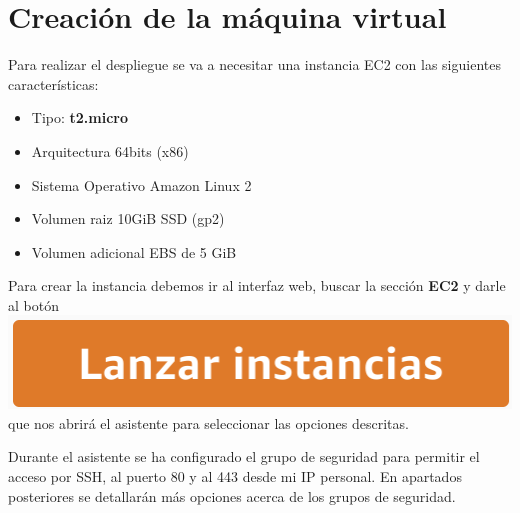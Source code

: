 \documentclass{\ClassPath/viu-tfm-template}
\begin{document}
\section{Creación de la máquina virtual}
Para realizar el despliegue se va a necesitar una instancia EC2 con las siguientes características:
\begin{itemize}
    \item Tipo: \textbf{t2.micro}
    \item Arquitectura 64bits (x86)
    \item Sistema Operativo Amazon Linux 2
    \item Volumen raiz 10GiB SSD (gp2)
    \item Volumen adicional EBS de 5 GiB
\end{itemize}

Para crear la instancia debemos ir al interfaz web, buscar la sección \textbf{EC2} y darle al botón \includegraphics[width=0.2\linewidth]{img/boton.png} que nos abrirá el asistente para seleccionar las opciones descritas.

Durante el asistente se ha configurado el grupo de seguridad para permitir el acceso por SSH, al puerto 80 y al 443 desde mi IP personal. En apartados posteriores se detallarán más opciones acerca de los grupos de seguridad.
\end{document}
